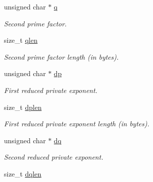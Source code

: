 \begin{DoxyCompactItemize}
unsigned char $\ast$ \hyperlink{structbr__rsa__private__key_ac30acdf290d3dc4a686af6b03c245581}{q}
\begin{DoxyCompactList}\small\item\em Second prime factor. \end{DoxyCompactList}\item 
\mbox{\label{structbr__rsa__private__key_aebb01978bb7b68f16669460b9f3cbcb2}} 
size\+\_\+t \hyperlink{structbr__rsa__private__key_aebb01978bb7b68f16669460b9f3cbcb2}{qlen}
\begin{DoxyCompactList}\small\item\em Second prime factor length (in bytes). \end{DoxyCompactList}\item 
\mbox{\label{structbr__rsa__private__key_a1a9343cde32431aca1a7d3b2a367cf97}} 
unsigned char $\ast$ \hyperlink{structbr__rsa__private__key_a1a9343cde32431aca1a7d3b2a367cf97}{dp}
\begin{DoxyCompactList}\small\item\em First reduced private exponent. \end{DoxyCompactList}\item 
\mbox{\label{structbr__rsa__private__key_aa1abb815bf9961340ca48f96fdd7a879}} 
size\+\_\+t \hyperlink{structbr__rsa__private__key_aa1abb815bf9961340ca48f96fdd7a879}{dplen}
\begin{DoxyCompactList}\small\item\em First reduced private exponent length (in bytes). \end{DoxyCompactList}\item 
\mbox{\label{structbr__rsa__private__key_ab236059c4f4ad886af9411b790c0d700}} 
unsigned char $\ast$ \hyperlink{structbr__rsa__private__key_ab236059c4f4ad886af9411b790c0d700}{dq}
\begin{DoxyCompactList}\small\item\em Second reduced private exponent. \end{DoxyCompactList}\item 
\mbox{\label{structbr__rsa__private__key_a2c53fb346f8b1deb36a5c448ec504dbc}} 
size\+\_\+t \hyperlink{structbr__rsa__private__key_a2c53fb346f8b1deb36a5c448ec504dbc}{dqlen}

\end{DoxyCompactItemize}
